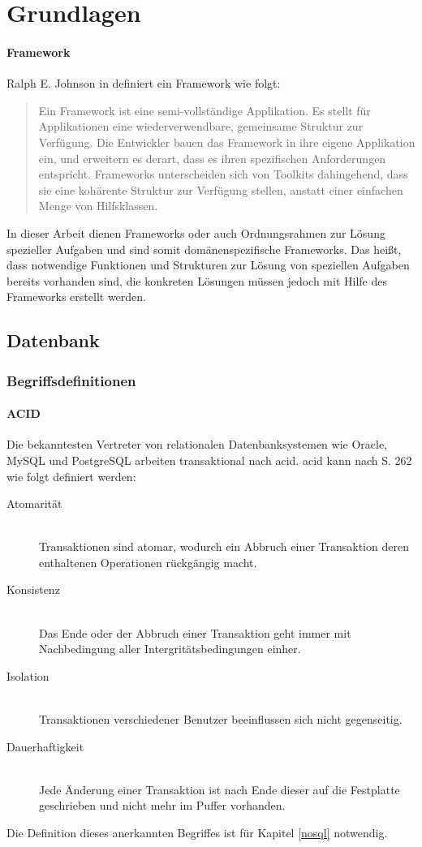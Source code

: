 \chapter{Grundlagen}
\label{Grundlagen}

\subsubsection{Framework}
Ralph E. Johnson in \cite{website:wiki-framework} definiert ein Framework wie folgt:
\begin{quote}
Ein Framework ist eine semi-vollständige Applikation. Es stellt für Applikationen eine wiederverwendbare, gemeinsame Struktur zur Verfügung. Die Entwickler bauen das Framework in ihre eigene Applikation ein, und erweitern es derart, dass es ihren spezifischen Anforderungen entspricht. Frameworks unterscheiden sich von Toolkits dahingehend, dass sie eine kohärente Struktur zur Verfügung stellen, anstatt einer einfachen Menge von Hilfsklassen.
\end{quote}
In dieser Arbeit dienen Frameworks oder auch Ordnungsrahmen zur Lösung spezieller Aufgaben und sind somit domänenspezifische Frameworks.
Das heißt, dass notwendige Funktionen und Strukturen zur Lösung von speziellen Aufgaben bereits vorhanden sind, die konkreten Lösungen müssen jedoch mit Hilfe des Frameworks erstellt werden.


\section{Datenbank}

\subsection{Begriffsdefinitionen}

\subsubsection{ACID}
Die bekanntesten Vertreter von relationalen Datenbanksystemen wie Oracle, MySQL und PostgreSQL arbeiten transaktional nach \Gls{acid}.
\Gls{acid} kann nach \cite{book:kudrass} S. 262 wie folgt definiert werden:
\begin{description}
\item[Atomarität] \hfill \\
Transaktionen sind atomar, wodurch ein Abbruch einer Transaktion deren enthaltenen Operationen rückgängig macht.
\item[Konsistenz] \hfill \\
Das Ende oder der Abbruch einer Transaktion geht immer mit Nachbedingung aller Intergritätsbedingungen einher.
\item[Isolation] \hfill \\
Transaktionen verschiedener Benutzer beeinflussen sich nicht gegenseitig.
\item[Dauerhaftigkeit] \hfill \\
Jede Änderung einer Transaktion ist nach Ende dieser auf die Festplatte geschrieben und nicht mehr im Puffer vorhanden.
\end{description}
Die Definition dieses anerkannten Begriffes ist für Kapitel \ref{nosql} notwendig.

